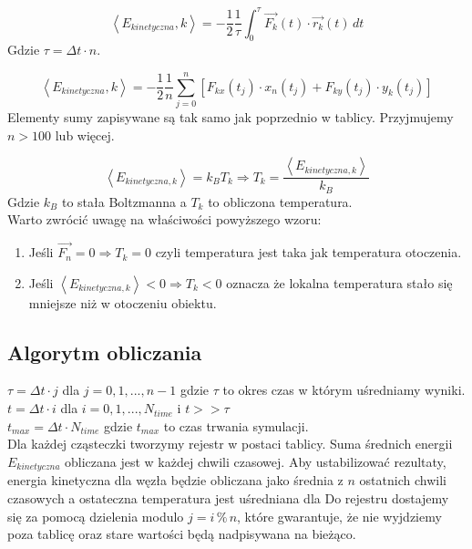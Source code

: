 \documentclass[12pt, letterpaper]{report}
\begin{document}
    \begin{equation}
        \left< E_{kinetyczna} , k \right> = 
        -\frac{1}{2} \frac{1}{\tau} \int_{0}^{\tau} \vec{F_k}(t) \cdot \vec{r_k}(t) \, dt
    \end{equation}
    Gdzie $\tau = \Delta t \cdot n$.

    \begin{equation}
        \left< E_{kinetyczna} , k \right> = 
        -\frac{1}{2} \frac{1}{n} \sum_{j = 0}^{n} \left[  F_{kx}(t_j) \cdot x_n(t_j) + F_{ky}(t_j) \cdot y_k(t_j) \right]
    \end{equation}
    Elementy sumy zapisywane są tak samo jak poprzednio w tablicy. Przyjmujemy $n > 100$ lub więcej. 

    \begin{equation}
        \left< E_{kinetyczna, k} \right> = k_B T_k \Rightarrow T_k = \frac{\left< E_{kinetyczna, k} \right>}{k_B}
    \end{equation}
    Gdzie $k_B$ to stała Boltzmanna a $T_k$ to obliczona temperatura. \\

    Warto zwrócić uwagę na właściwości powyższego wzoru:
    \begin{enumerate}
        \item Jeśli $\vec{F_n} = 0 \Rightarrow T_k = 0$ czyli temperatura jest taka jak temperatura otoczenia.
        \item Jeśli $\left< E_{kinetyczna, k} \right> < 0 \Rightarrow T_k < 0$ oznacza że lokalna 
        temperatura stało się mniejsze niż w otoczeniu obiektu.
    \end{enumerate}

    \subsection{Algorytm obliczania}
    $\tau = \Delta t \cdot j$ dla $j = 0, 1, ..., n-1$ gdzie $\tau$ to okres czas w którym uśredniamy wyniki. \\ 
    $t = \Delta t \cdot i$ dla $i = 0, 1, ..., N_{time}$ i $t >> \tau$\\ 
    $t_{max} = \Delta t \cdot N_{time}$ gdzie $t_{max}$ to czas trwania symulacji. \\
    
    Dla każdej cząsteczki tworzymy rejestr w postaci tablicy. 
    Suma średnich energii $E_{kinetyczna}$ obliczana jest w każdej chwili czasowej.
    Aby ustabilizować rezultaty, energia kinetyczna dla węzła będzie obliczana jako 
    średnia z $n$ ostatnich chwili czasowych a ostateczna temperatura jest uśredniana dla 
    Do rejestru dostajemy się za pomocą dzielenia modulo $j = i \, \%  \, n$, które gwarantuje, 
    że nie wyjdziemy poza tablicę oraz stare wartości będą nadpisywana na bieżąco. \\
\end{document}
